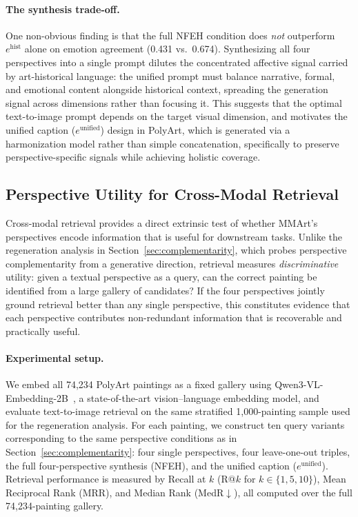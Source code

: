 \paragraph{The synthesis trade-off.}
One non-obvious finding is that the full NFEH condition does \emph{not} outperform $e^{\text{hist}}$ alone on emotion agreement (0.431 vs.\ 0.674).
Synthesizing all four perspectives into a single prompt dilutes the concentrated affective signal carried by art-historical language: the unified prompt must balance narrative, formal, and emotional content alongside historical context, spreading the generation signal across dimensions rather than focusing it.
This suggests that the optimal text-to-image prompt depends on the target visual dimension, and motivates the unified caption ($e^{\text{unified}}$) design in PolyArt, which is generated via a harmonization model rather than simple concatenation, specifically to preserve perspective-specific signals while achieving holistic coverage.


\subsection{Perspective Utility for Cross-Modal Retrieval}

Cross-modal retrieval provides a direct extrinsic test of whether MMArt's perspectives encode information that is useful for downstream tasks. Unlike the regeneration analysis in Section~\ref{sec:complementarity}, which probes perspective complementarity from a generative direction, retrieval measures \emph{discriminative} utility: given a textual perspective as a query, can the correct painting be identified from a large gallery of candidates? If the four perspectives jointly ground retrieval better than any single perspective, this constitutes evidence that each perspective contributes non-redundant information that is recoverable and practically useful.

\paragraph{Experimental setup.}
We embed all 74,234 PolyArt paintings as a fixed gallery using Qwen3-VL-Embedding-2B~\cite{qwen3vl}, a state-of-the-art vision--language embedding model, and evaluate text-to-image retrieval on the same stratified 1,000-painting sample used for the regeneration analysis.
For each painting, we construct ten query variants corresponding to the same perspective conditions as in Section~\ref{sec:complementarity}: four single perspectives, four leave-one-out triples, the full four-perspective synthesis (NFEH), and the unified caption ($e^{\text{unified}}$).
Retrieval performance is measured by Recall at $k$ (R@$k$ for $k \in \{1, 5, 10\}$), Mean Reciprocal Rank (MRR), and Median Rank (MedR$\downarrow$), all computed over the full 74,234-painting gallery.

